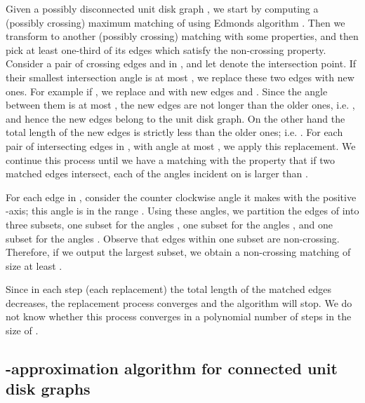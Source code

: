 \documentclass[11pt,a4paper]{article}
\begin{document}
Given a possibly disconnected unit disk graph , we start by computing a (possibly crossing) maximum matching  of  using Edmonds algorithm \cite{Edmonds1965}. Then we transform  to another (possibly crossing) matching  with some properties, and then pick at least one-third of its edges which satisfy the non-crossing property. Consider a pair of crossing edges  and  in , and let  denote the intersection point. If their smallest intersection angle is at most , we replace these two edges with new ones. For example if , we replace  and  with new edges  and . Since the angle between them is at most , the new edges are not longer than the older ones, i.e. , and hence the new edges belong to the unit disk graph. On the other hand the total length of the new edges is strictly less than the older ones; i.e. . For each pair of intersecting edges in , with angle at most , we apply this replacement. We continue this process until we have a matching  with the property that if two matched edges intersect, each of the angles incident on  is larger than .

For each edge in , consider the counter clockwise angle it makes with the positive -axis; this angle is in the range . Using these angles, we partition the edges of  into three subsets, one subset for the angles , one subset for the angles , and
one subset for the angles . Observe that edges within one subset are non-crossing. Therefore, if we output the largest subset, we obtain a non-crossing matching of size at least
.

Since in each step (each replacement) the total length of the matched edges decreases, the replacement process converges and the algorithm will stop. We do not know whether this process converges in a polynomial number of steps in the size of .

\subsection{-approximation algorithm for connected unit disk graphs}
\label{five-over-two-approximation}
\end{document}
